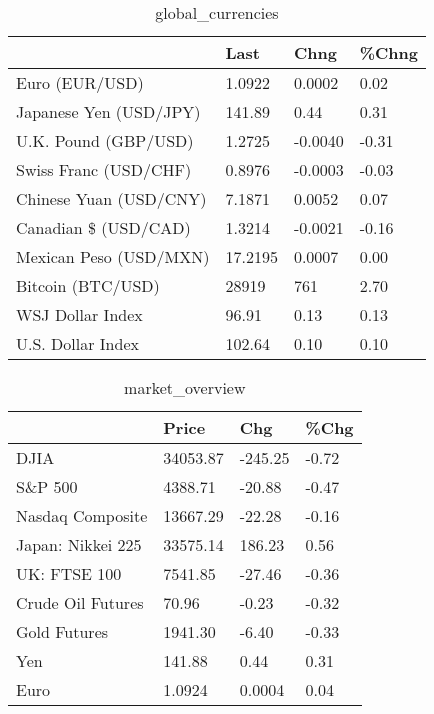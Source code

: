 \documentclass{article}%
\begin{document}
%


\begin{table}[htbp]%
\caption{global\_currencies}%
\centering%
\begin{adjustbox}{width=1\textwidth}%
\begin{tabular}{llll}
\toprule
                       &    Last &    Chng & \%Chng \\
\midrule
        Euro (EUR/USD) &  1.0922 &  0.0002 &  0.02 \\
Japanese Yen (USD/JPY) &  141.89 &    0.44 &  0.31 \\
  U.K. Pound (GBP/USD) &  1.2725 & -0.0040 & -0.31 \\
 Swiss Franc (USD/CHF) &  0.8976 & -0.0003 & -0.03 \\
Chinese Yuan (USD/CNY) &  7.1871 &  0.0052 &  0.07 \\
  Canadian \$ (USD/CAD) &  1.3214 & -0.0021 & -0.16 \\
Mexican Peso (USD/MXN) & 17.2195 &  0.0007 &  0.00 \\
     Bitcoin (BTC/USD) &   28919 &     761 &  2.70 \\
      WSJ Dollar Index &   96.91 &    0.13 &  0.13 \\
     U.S. Dollar Index &  102.64 &    0.10 &  0.10 \\
\bottomrule
\end{tabular}
%
\end{adjustbox}%
\end{table}

%


\begin{table}[htbp]%
\caption{market\_overview}%
\centering%
\begin{adjustbox}{width=1\textwidth}%
\begin{tabular}{llll}
\toprule
                  &    Price &     Chg &  \%Chg \\
\midrule
             DJIA & 34053.87 & -245.25 & -0.72 \\
          S\&P 500 &  4388.71 &  -20.88 & -0.47 \\
 Nasdaq Composite & 13667.29 &  -22.28 & -0.16 \\
Japan: Nikkei 225 & 33575.14 &  186.23 &  0.56 \\
     UK: FTSE 100 &  7541.85 &  -27.46 & -0.36 \\
Crude Oil Futures &    70.96 &   -0.23 & -0.32 \\
     Gold Futures &  1941.30 &   -6.40 & -0.33 \\
              Yen &   141.88 &    0.44 &  0.31 \\
             Euro &   1.0924 &  0.0004 &  0.04 \\
\bottomrule
\end{tabular}
%
\end{adjustbox}%
\end{table}

%
\end{document}
